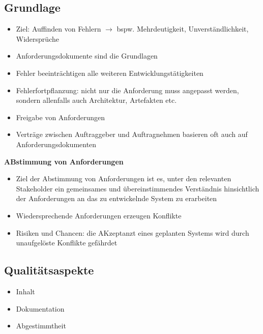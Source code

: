 \documentclass{report}
\theoremstyle{definition}
\theoremstyle{example}
\begin{document}
\subsection{Grundlage}
\begin{itemize}
   \item Ziel: Auffinden von Fehlern $\rightarrow$ bspw. Mehrdeutigkeit, Unverständlichkeit, Widersprüche
   \item Anforderungsdokumente sind die Grundlagen
   \item Fehler beeinträchtigen alle weiteren Entwicklungstätigkeiten
   \item Fehlerfortpflanzung: nicht nur die Anforderung muss angepasst werden, sondern allenfalls auch Architektur, Artefakten etc.
   \item Freigabe von Anforderungen
   \item Verträge zwischen Auftraggeber und Auftragnehmen basieren oft auch auf Anforderungsdokumenten
\end{itemize}
\textbf{ABstimmung von Anforderungen}
\begin{itemize}
   \item Ziel der Abstimmung von Anforderungen ist es, unter den relevanten Stakeholder ein gemeinsames und übereinstimmendes Verständnis hinsichtlich der Anforderungen an das zu entwickelnde System zu erarbeiten
   \item Wiedersprechende Anforderungen erzeugen Konflikte
   \item Risiken und Chancen: die AKzeptanzt eines geplanten Systems wird durch unaufgelöste Konflikte gefährdet
\end{itemize}

\subsection{Qualitätsaspekte}
\begin{itemize}
   \item Inhalt
   \item Dokumentation
   \item Abgestimmtheit
\end{itemize}
\end{document}
